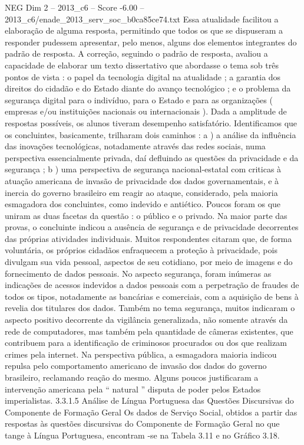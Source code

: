 \begin{textsample}{NEG Dim 2 – 2013\_c6 – Score -6.00 – 2013\_c6/enade\_2013\_serv\_soc\_b0ca85ce74.txt}
Essa atualidade facilitou a elaboração de alguma resposta, permitindo que todos os que se dispuseram a responder pudessem apresentar, pelo menos, alguns dos elementos integrantes do padrão de resposta.
A correção, seguindo o padrão de resposta, avaliou a capacidade de elaborar um texto dissertativo que abordasse o tema sob três pontos de vista : o papel da tecnologia digital na atualidade ; a garantia dos direitos do cidadão e do Estado diante do avanço tecnológico ; e o problema da segurança digital para o indivíduo, para o Estado e para as organizações ( empresas e/ou instituições nacionais ou internacionais ).
Dada a amplitude de respostas possíveis, os alunos tiveram desempenho satisfatório.
Identificamos que os concluintes, basicamente, trilharam dois caminhos : a ) a análise da influência das inovações tecnológicas, notadamente através das redes sociais, numa perspectiva essencialmente privada, daí defluindo as questões da privacidade e da segurança ; b ) uma perspectiva de segurança nacional-estatal com criticas à atuação americana de invasão de privacidade dos dados governamentais, e à inercia do governo brasileiro em reagir ao ataque, considerado, pela maioria esmagadora dos concluintes, como indevido e antiético.
Poucos foram os que uniram as duas facetas da questão : o público e o privado.
Na maior parte das provas, o concluinte indicou a ausência de segurança e de privacidade decorrentes das próprias atividades individuais.
Muitos respondentes citaram que, de forma voluntária, os próprios cidadãos enfraquecem a proteção à privacidade, pois divulgam sua vida pessoal, aspectos de seu cotidiano, por meio de imagens e do fornecimento de dados pessoais.
No aspecto segurança, foram inúmeras as indicações de acessos indevidos a dados pessoais com a perpetração de fraudes de todos os tipos, notadamente as bancárias e comerciais, com a aquisição de bens à revelia dos titulares dos dados.
Também no tema segurança, muitos indicaram o aspecto positivo decorrente da vigilância generalizada, não somente através da rede de computadores, mas também pela quantidade de câmeras existentes, que contribuem para a identificação de criminosos procurados ou dos que realizam crimes pela internet.
Na perspectiva pública, a esmagadora maioria indicou repulsa pelo comportamento americano de invasão dos dados do governo brasileiro, reclamando reação do mesmo.
Alguns poucos justificaram a intervenção americana pela “ natural ” disputa de poder pelos Estados imperialistas. 3.3.1.5 Análise de Língua Portuguesa das Questões Discursivas do Componente de Formação Geral Os dados de Serviço Social, obtidos a partir das respostas às questões discursivas do Componente de Formação Geral no que tange à Língua Portuguesa, encontram -se na Tabela 3.11 e no Gráfico 3.18.

\end{textsample}

